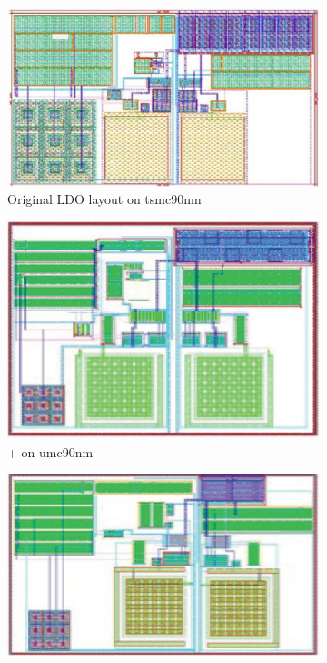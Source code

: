       \begin{figure}[ht]
        \centering
        \begin{subfigure}[t]{\textwidth}
        \includegraphics[width=\textwidth]{Fig/LDO_tsmc90_MR_1.eps}
        \caption{Original LDO layout on tsmc90nm}\label{fig:Original_LDO}
        \end{subfigure}
        \begin{subfigure}[t]{0.4\textwidth}
        \includegraphics[width=\textwidth]{Fig/LDO_umc90_PlFuRtCDT_1.eps}
        \caption{\cite{msc-bhattacharya-tcad06}+\cite{Chin_DMR_ICCAD2013} on umc90nm}\label{subfig:LDO_umc90_PlFuRtCDT}
        \end{subfigure}
        \begin{subfigure}[t]{0.4\textwidth}
        \includegraphics[width=\textwidth]{Fig/LDO_umc65_PlFuRtCDT_1.eps}

\end{subfigure}
\end{figure}
